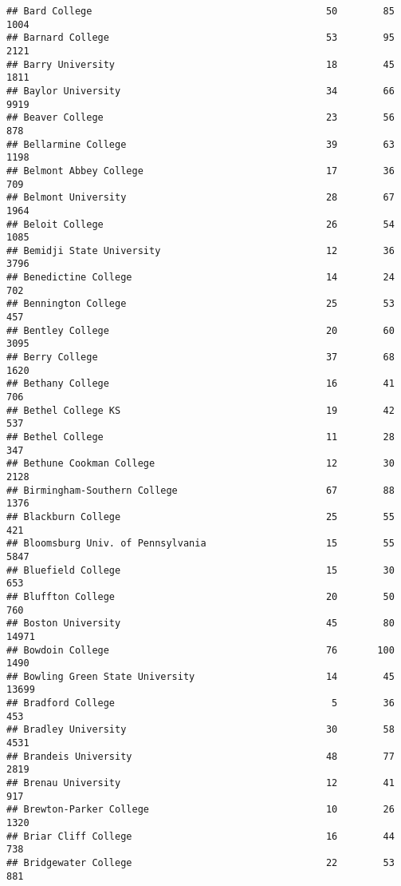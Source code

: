 \documentclass[
]{article}
\begin{document}
\begin{verbatim}
## Bard College                                         50        85        1004
## Barnard College                                      53        95        2121
## Barry University                                     18        45        1811
## Baylor University                                    34        66        9919
## Beaver College                                       23        56         878
## Bellarmine College                                   39        63        1198
## Belmont Abbey College                                17        36         709
## Belmont University                                   28        67        1964
## Beloit College                                       26        54        1085
## Bemidji State University                             12        36        3796
## Benedictine College                                  14        24         702
## Bennington College                                   25        53         457
## Bentley College                                      20        60        3095
## Berry College                                        37        68        1620
## Bethany College                                      16        41         706
## Bethel College KS                                    19        42         537
## Bethel College                                       11        28         347
## Bethune Cookman College                              12        30        2128
## Birmingham-Southern College                          67        88        1376
## Blackburn College                                    25        55         421
## Bloomsburg Univ. of Pennsylvania                     15        55        5847
## Bluefield College                                    15        30         653
## Bluffton College                                     20        50         760
## Boston University                                    45        80       14971
## Bowdoin College                                      76       100        1490
## Bowling Green State University                       14        45       13699
## Bradford College                                      5        36         453
## Bradley University                                   30        58        4531
## Brandeis University                                  48        77        2819
## Brenau University                                    12        41         917
## Brewton-Parker College                               10        26        1320
## Briar Cliff College                                  16        44         738
## Bridgewater College                                  22        53         881

\end{verbatim}
\end{document}
